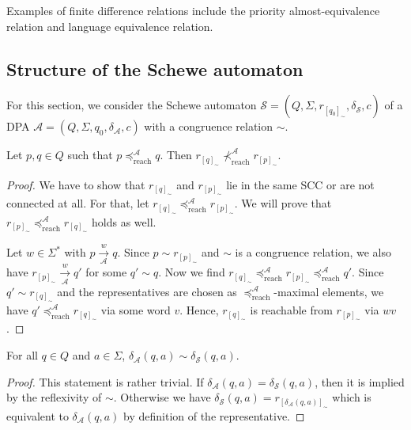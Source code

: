 Examples of finite difference relations include the priority almost-equivalence relation and language equivalence relation.


\newpage

\subsection{Structure of the Schewe automaton}
For this section, we consider the Schewe automaton $\mathcal{S} = (Q, \Sigma, r_{[q_0]_\sim}, \delta_\mathcal{S}, c)$ of a DPA $\mathcal{A} = (Q, \Sigma, q_0, \delta_\mathcal{A}, c)$ with a congruence relation $\sim$.

\begin{lem}
	Let $p, q \in Q$ such that $p \preceq_\text{reach}^\mathcal{A} q$. Then $r_{[q]_\sim} \not\prec_\text{reach}^\mathcal{A} r_{[p]_\sim}$.
\end{lem}
\begin{proof}
	We have to show that $r_{[q]_\sim}$ and $r_{[p]_\sim}$ lie in the same SCC or are not connected at all. For that, let $r_{[q]_\sim} \preceq_\text{reach}^\mathcal{A} r_{[p]_\sim}$. We will prove that $r_{[p]_\sim} \preceq_\text{reach}^\mathcal{A} r_{[q]_\sim}$ holds as well.
	
	Let $w \in \Sigma^*$ with $p \overset{w}{\underset{\mathcal{A}}{\rightarrow}} q$. Since $p \sim r_{[p]_\sim}$ and $\sim$ is a congruence relation, we also have $r_{[p]_\sim} \overset{w}{\underset{\mathcal{A}}{\rightarrow}} q'$ for some $q' \sim q$. Now we find $r_{[q]_\sim} \preceq_\text{reach}^\mathcal{A} r_{[p]_\sim} \preceq_\text{reach}^\mathcal{A} q'$. Since $q' \sim r_{[q]_\sim}$ and the representatives are chosen as $\preceq_\text{reach}^\mathcal{A}$-maximal elements, we have $q' \preceq_\text{reach}^\mathcal{A} r_{[q]_\sim}$ via some word $v$. Hence, $r_{[q]_\sim}$ is reachable from $r_{[p]_\sim}$ via $wv$.
\end{proof}

\begin{lem}
	For all $q \in Q$ and $a \in \Sigma$, $\delta_\mathcal{A}(q, a) \sim \delta_\mathcal{S}(q, a)$.
\end{lem}

\begin{proof}
	This statement is rather trivial. If $\delta_\mathcal{A}(q, a) = \delta_\mathcal{S}(q, a)$, then it is implied by the reflexivity of $\sim$. Otherwise we have $\delta_\mathcal{S}(q, a) = r_{[\delta_\mathcal{A}(q, a)]_\sim}$ which is equivalent to $\delta_\mathcal{A}(q, a)$ by definition of the representative.
\end{proof}


